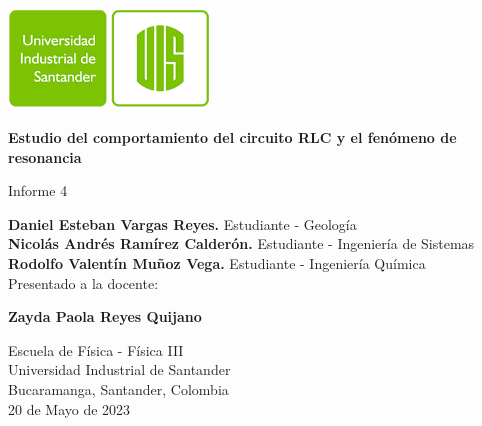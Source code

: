 \begin{titlepage}
    \begin{center}
        \includegraphics[width=0.4\textwidth]{../general-images/uis-logo.png}
        
        \vspace{0.5cm}
        \LARGE
        \textbf{Estudio del comportamiento del circuito RLC y el fenómeno de resonancia}
        
        \vspace{0.5cm}
        \large
        Informe 4
        
        \vfill
        
        \textbf{Daniel Esteban Vargas Reyes.} Estudiante - Geología\\
        \textbf{Nicolás Andrés Ramírez Calderón.} Estudiante - Ingeniería de Sistemas\\ 
        \textbf{Rodolfo Valentín Muñoz Vega.} Estudiante - Ingeniería Química\\

        \vspace{1.0cm}
        Presentado a la docente:
        
        \textbf{Zayda Paola Reyes Quijano}
        
        \vfill
        
        Escuela de Física - Física III\\
        Universidad Industrial de Santander\\
        Bucaramanga, Santander, Colombia\\
        20 de Mayo de 2023        
    \end{center}
\end{titlepage}
